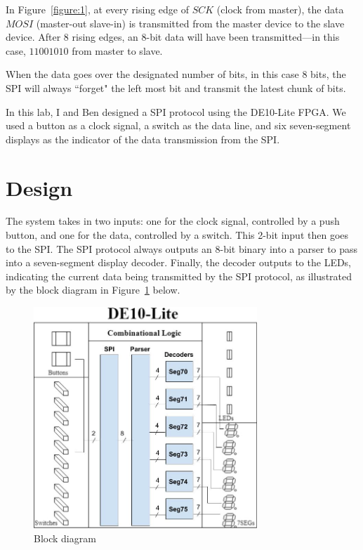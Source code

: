 \documentclass[12pt]{article}
\begin{document}
In Figure~\ref{figure:1}, at every rising edge of $SCK$ (clock from master), the data $MOSI$ (master-out slave-in) is transmitted from the master device to the slave device. After 8 rising edges, an 8-bit data will have been transmitted---in this case, $11001010$ from master to slave.

When the data goes over the designated number of bits, in this case 8 bits, the SPI will always ``forget" the left most bit and transmit the latest chunk of bits.

In this lab, I and Ben designed a SPI protocol using the DE10-Lite FPGA. We used a button as a clock signal, a switch as the data line, and six seven-segment displays as the indicator of the data transmission from the SPI.

\section{Design}

The system takes in two inputs: one for the clock signal, controlled by a push button, and one for the data, controlled by a switch. This 2-bit input then goes to the SPI. The SPI protocol always outputs an 8-bit binary into a parser to pass into a seven-segment display decoder. Finally, the decoder outputs to the LEDs, indicating the current data being transmitted by the SPI protocol, as illustrated by the block diagram in Figure~\ref{figure:2} below.

\begin{figure}[ht]
  \centering
  \includegraphics[width=0.75\textwidth]{lab5_block_diagram.png}
  \caption{Block diagram}
  \label{figure:2}
\end{figure}
\end{document}
